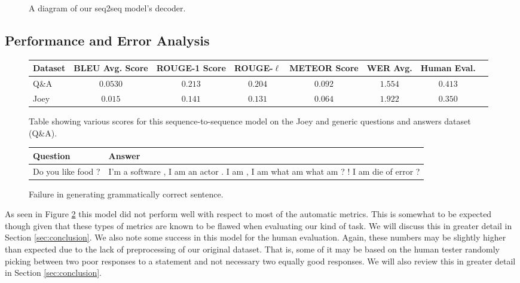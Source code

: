 \begin{figure}
	\begin{center}
	\end{center}
	\caption{A diagram of our seq2seq model's decoder.}
	\label{fig:s2s_model_decoder}
\end{figure} 

\subsection{Performance and Error Analysis}
\label{subsec:s2s}
\begin{figure}
\begin{center}
	\scalebox{.8}
	{
	\begin{tabular}{ |l|c|c|c|c|c|c|c| } 
		\hline
		\textbf{Dataset} & \textbf{BLEU Avg. Score} & \textbf{ROUGE-1 Score} & \textbf{ROUGE-$\ell$} & \textbf{METEOR Score} & \textbf{WER Avg.} & \textbf{Human Eval.}\\
		\hline
		Q\&A & $0.0530$ & $0.213$ & $0.204$ & $0.092$ & $1.554$ & $0.413$\\
		\hline
		Joey & $0.015$ & $0.141$ & $0.131$ & $0.064$ & $1.922$ & $0.350$\\ 
		\hline
	\end{tabular}
	}
\end{center}
\caption{Table showing various scores for this sequence-to-sequence model on the Joey and generic questions and answers dataset (Q\&A).}
\label{fig:s2s_res}
\end{figure}

\begin{figure}
\begin{center}
	\scalebox{.8}
	{
	\begin{tabular}{ |L|L| } 
		\hline
		\textbf{Question} & \textbf{Answer} \\
		\hline
		 Do you like food ? & I'm a software , I am an actor . I am , I am what am what am ? ! I am die of error ? \\
		\hline
	\end{tabular}
	}
\end{center}
\caption{Failure in generating grammatically correct sentence.}
\label{fig:s2s_errors}
\end{figure}

As seen in Figure \ref{fig:s2s_res} this model did not perform well with respect to most of the automatic metrics.
This is somewhat to be expected though given that these types of metrics are known to be flawed when evaluating our kind of task.
We will discuss this in greater detail in Section \ref{sec:conclusion}.
We also note some success in this model for the human evaluation.
Again, these numbers may be slightly higher than expected due to the lack of preprocessing of our original dataset.
That is, some of it may be based on the human tester randomly picking between two poor responses to a statement and not necessary two equally good responses. 
We will also review this in greater detail in Section \ref{sec:conclusion}.

